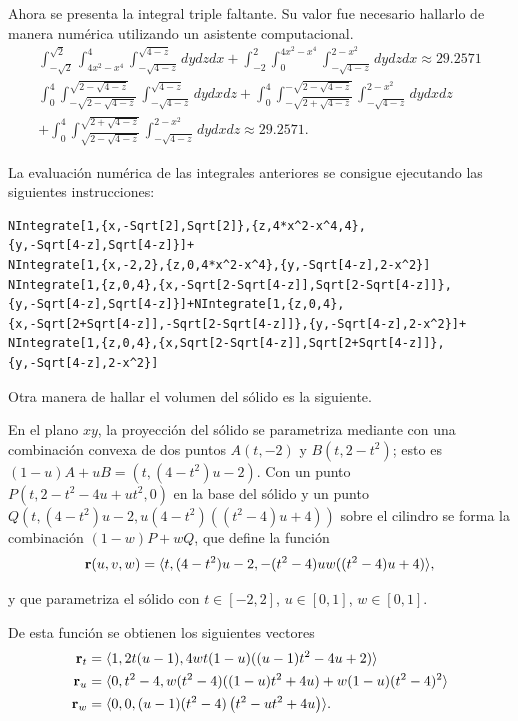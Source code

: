 Ahora se presenta la integral triple faltante. Su valor fue necesario hallarlo de manera numérica utilizando un asistente computacional.
\begin{multline*}
\int_{-\sqrt{2}}^{\sqrt{2}}\int_{4x^2-x^{4}}^{4}\int_{-\sqrt{4-z}}^{\sqrt{4-z}}dydzdx+\int_{-2}^2\int_{0}^{4x^2-x^{4}}\int_{-\sqrt{4-z}}^{2-x^2}dydzdx \approx 29.2571\\
\int_{0}^{4}\int_{-\sqrt{2-\sqrt{4-z}}}^{\sqrt{2-\sqrt{4-z}}}\int_{-\sqrt{4-z}}^{\sqrt{4-z}}dydxdz+\int_{0}^{4}\int_{-\sqrt{2+\sqrt{4-z}}}^{-\sqrt{2-\sqrt{4-z}}}\int_{-\sqrt{4-z}}^{2-x^2}dydxdz\\
+\int_{0}^{4}\int_{\sqrt{2-\sqrt{4-z}}}^{\sqrt{2+\sqrt{4-z}}}\int_{-\sqrt{4-z}}^{2-x^2}dydxdz \approx 29.2571.
\end{multline*}

La evaluación numérica de las integrales anteriores se consigue ejecutando las siguientes instrucciones:

\begin{tcolorbox}[title=\bf Instrucción en \verb"Mathematica"]\begin{Verbatim}[formatcom=\letraverbatim]
NIntegrate[1,{x,-Sqrt[2],Sqrt[2]},{z,4*x^2-x^4,4},
{y,-Sqrt[4-z],Sqrt[4-z]}]+
NIntegrate[1,{x,-2,2},{z,0,4*x^2-x^4},{y,-Sqrt[4-z],2-x^2}]
NIntegrate[1,{z,0,4},{x,-Sqrt[2-Sqrt[4-z]],Sqrt[2-Sqrt[4-z]]},
{y,-Sqrt[4-z],Sqrt[4-z]}]+NIntegrate[1,{z,0,4},
{x,-Sqrt[2+Sqrt[4-z]],-Sqrt[2-Sqrt[4-z]]},{y,-Sqrt[4-z],2-x^2}]+
NIntegrate[1,{z,0,4},{x,Sqrt[2-Sqrt[4-z]],Sqrt[2+Sqrt[4-z]]},
{y,-Sqrt[4-z],2-x^2}]
\end{Verbatim}
\end{tcolorbox}

Otra manera de hallar el volumen del sólido es la siguiente.
%

En el plano $xy$, la proyección del sólido se parametriza mediante con una combinación convexa de dos puntos
$A(t,-2)$ y $B(t,2-t^2)$; esto es $(1-u)A+uB=(t,(4-t^2)u-2)$.
Con un punto $P\left(t,2-t^2-4u+ut^2,0\right) $ en la base del sólido y un punto $Q\left( t,(4-t^2)u-2,u(4-t^2)((t^2-4)u+4)\right)$
sobre el cilindro se forma la combinación $(1-w)P+wQ$, que define la función
{\small
\[{\bf r}(u,v,w) = \langle t,(4-t^2)u-2,-(t^2-4)uw((t^2-4)u+4)\rangle,
\]}

y que parametriza el sólido con $t\in [ -2,2]$, $u\in [0,1]$, $w\in [0,1]$.

De esta función se obtienen los siguientes vectores
\begin{align*}
{\bf r}_{t}&= \langle 1,2t(u-1),4wt(1-u)((u-1)t^2-4u+2) \rangle\\
{\bf r}_{u} &= \langle 0,t^2-4,w(t^2-4) ((1-u)t^2+4u) +w(1-u)(t^2-4)^2 \rangle \\
{\bf r}_{w} &= \langle 0,0,(u-1)( t^2-4) \left(t^2-ut^2+4u\right) \rangle.
\end{align*}

